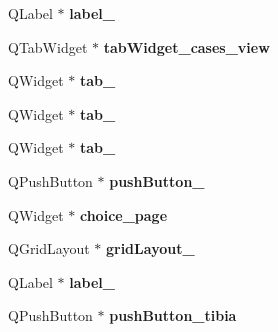 \begin{DoxyCompactItemize}
\item 
Q\+Label $\ast$ {\bfseries label\+\_}\hypertarget{class_ui___navar_q_t_class_a34f81b01eda90da73238859a0efe2911}{}\label{class_ui___navar_q_t_class_a34f81b01eda90da73238859a0efe2911}

\item 
Q\+Tab\+Widget $\ast$ {\bfseries tab\+Widget\+\_\+cases\+\_\+view}\hypertarget{class_ui___navar_q_t_class_a5e16329bea8e825d0e3427ac64fef21d}{}\label{class_ui___navar_q_t_class_a5e16329bea8e825d0e3427ac64fef21d}

\item 
Q\+Widget $\ast$ {\bfseries tab\+\_}\hypertarget{class_ui___navar_q_t_class_acb6a50227e079012cb39cc1dbdd8edcc}{}\label{class_ui___navar_q_t_class_acb6a50227e079012cb39cc1dbdd8edcc}

\item 
Q\+Widget $\ast$ {\bfseries tab\+\_}\hypertarget{class_ui___navar_q_t_class_a6ba9496af5a005afa5ab3549954c46d9}{}\label{class_ui___navar_q_t_class_a6ba9496af5a005afa5ab3549954c46d9}

\item 
Q\+Widget $\ast$ {\bfseries tab\+\_}\hypertarget{class_ui___navar_q_t_class_a028f2a5889c2cc7f6eda8ab716bec115}{}\label{class_ui___navar_q_t_class_a028f2a5889c2cc7f6eda8ab716bec115}

\item 
Q\+Push\+Button $\ast$ {\bfseries push\+Button\+\_}\hypertarget{class_ui___navar_q_t_class_a88d5940fb1d2796e39aa9128a4583686}{}\label{class_ui___navar_q_t_class_a88d5940fb1d2796e39aa9128a4583686}

\item 
Q\+Widget $\ast$ {\bfseries choice\+\_\+page}\hypertarget{class_ui___navar_q_t_class_a17b974b96d4826480b5ba817598fd397}{}\label{class_ui___navar_q_t_class_a17b974b96d4826480b5ba817598fd397}

\item 
Q\+Grid\+Layout $\ast$ {\bfseries grid\+Layout\+\_}\hypertarget{class_ui___navar_q_t_class_a20ea2af8046e1c4cd5576b88f0826e60}{}\label{class_ui___navar_q_t_class_a20ea2af8046e1c4cd5576b88f0826e60}

\item 
Q\+Label $\ast$ {\bfseries label\+\_}\hypertarget{class_ui___navar_q_t_class_a765ca4653b352fc0000f84e39d429d52}{}\label{class_ui___navar_q_t_class_a765ca4653b352fc0000f84e39d429d52}

\item 
Q\+Push\+Button $\ast$ {\bfseries push\+Button\+\_\+tibia}\hypertarget{class_ui___navar_q_t_class_a68ae50af3bf6070d0ae4119df535ea3d}{}\label{class_ui___navar_q_t_class_a68ae50af3bf6070d0ae4119df535ea3d}


\end{DoxyCompactItemize}
